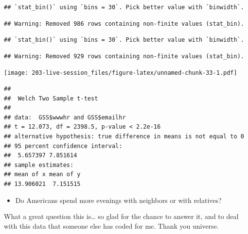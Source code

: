 \documentclass[
]{book}
\newenvironment{Shaded}{\begin{snugshade}}{\end{snugshade}}
\newcommand{\AttributeTok}[1]{\textcolor[rgb]{0.77,0.63,0.00}{#1}}
\newcommand{\ConstantTok}[1]{\textcolor[rgb]{0.00,0.00,0.00}{#1}}
\newcommand{\FunctionTok}[1]{\textcolor[rgb]{0.00,0.00,0.00}{#1}}
\newcommand{\NormalTok}[1]{#1}
\newcommand{\SpecialCharTok}[1]{\textcolor[rgb]{0.00,0.00,0.00}{#1}}
\providecommand{\tightlist}{%
  \setlength{\itemsep}{0pt}\setlength{\parskip}{0pt}}
\theoremstyle{definition}
\theoremstyle{definition}
\theoremstyle{definition}
\theoremstyle{definition}
\theoremstyle{remark}
\begin{document}
\begin{verbatim}
## `stat_bin()` using `bins = 30`. Pick better value with `binwidth`.
\end{verbatim}

\begin{verbatim}
## Warning: Removed 986 rows containing non-finite values (stat_bin).
\end{verbatim}

\begin{verbatim}
## `stat_bin()` using `bins = 30`. Pick better value with `binwidth`.
\end{verbatim}

\begin{verbatim}
## Warning: Removed 929 rows containing non-finite values (stat_bin).
\end{verbatim}

\texttt{[image: 203-live-session\_files/figure-latex/unnamed-chunk-33-1.pdf]}

\begin{Shaded}
\end{Shaded}

\begin{verbatim}
## 
##  Welch Two Sample t-test
## 
## data:  GSS$wwwhr and GSS$emailhr
## t = 12.073, df = 2398.5, p-value < 2.2e-16
## alternative hypothesis: true difference in means is not equal to 0
## 95 percent confidence interval:
##  5.657397 7.851614
## sample estimates:
## mean of x mean of y 
## 13.906021  7.151515
\end{verbatim}

\begin{itemize}
\tightlist
\item
  Do Americans spend more evenings with neighbors or with relatives?
\end{itemize}

What a great question this is\ldots{} so glad for the chance to answer it, and to deal with this data that someone else has coded for me. Thank you universe.
\end{document}
